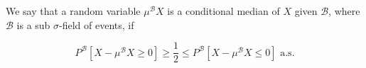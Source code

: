 We say that a random variable $\mu^{\mathcal{B}}X$ is a conditional median of $X$ given $\mathcal{B}$, where $\mathcal{B}$ is a sub $\sigma$-field of events, if

$$P^{\mathcal{B}}[X - \mu^{\mathcal{B}}X \geq 0] \geq \frac{1}{2} \leq P^{\mathcal{B}}[X - \mu^{\mathcal{B}}X \leq 0] \text{ a.s.}$$
